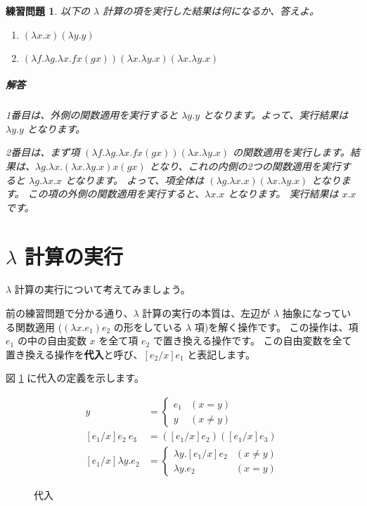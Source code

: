 \documentclass[b5paper]{jsbook}
\newtheorem{exercise}{練習問題}[chapter]
\begin{document}
\begin{exercise}

以下の $\lambda$ 計算の項を実行した結果は何になるか、答えよ。

\begin{enumerate}
  \item $(\lambda x . x) (\lambda y . y)$
  \item $(\lambda f . \lambda g . \lambda x . f x (g x))
		(\lambda x . \lambda y . x) (\lambda x . \lambda y . x)$
\end{enumerate}

\subparagraph{解答}

1番目は、外側の関数適用を実行すると $\lambda y . y$ となります。よって、実行結果は $\lambda y . y$
となります。

2番目は、まず項 $(\lambda f . \lambda g . \lambda x . f x (g x)) (\lambda x . \lambda y . x)$
の関数適用を実行します。結果は、$\lambda g . \lambda x . (\lambda x . \lambda y . x) x (g x)$
となり、これの内側の2つの関数適用を実行すると $\lambda g . \lambda x . x$ となります。
よって、項全体は $(\lambda g . \lambda x . x) (\lambda x . \lambda y . x)$ となります。
この項の外側の関数適用を実行すると、$\lambda x . x$ となります。
実行結果は $x . x$ です。

\end{exercise}

\section{$\lambda$ 計算の実行}

$\lambda$ 計算の実行について考えてみましょう。

前の練習問題で分かる通り、$\lambda$ 計算の実行の本質は、左辺が $\lambda$ 抽象になっている関数適用
($(\lambda x . e_1) e_2$ の形をしている $\lambda$ 項)を解く操作です。
この操作は、項 $e_1$ の中の自由変数 $x$ を全て項 $e_2$ で置き換える操作です。
この自由変数を全て置き換える操作を\textbf{代入}と呼び、$[e_2/x] e_1$ と表記します。

図 \ref{fig:lambda-substitute} に代入の定義を示します。

\begin{figure}[htbp]
  \begin{align*}
    [e_1/x] y & = \left \{
      \begin{array}{ll}
        e_1 & (x = y) \\
        y & (x \neq y)
      \end{array}
      \right. \\
    [e_1/x] e_2 ~ e_3 & = ([e_1/x] e_2) ([e_1/x] e_3) \\
    [e_1/x] \lambda y . e_2 & = \left \{
      \begin{array}{ll}
        \lambda y . [e_1/x] e_2 & (x \neq y) \\
        \lambda y . e_2 & (x = y)
      \end{array}
      \right.
  \end{align*}
  \caption{代入}
  \label{fig:lambda-substitute}
\end{figure}
\end{document}
